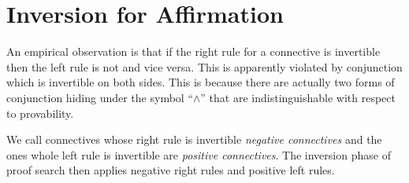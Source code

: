 \documentclass[11pt]{article}
\begin{document}
\section{Inversion for Affirmation}

An empirical observation is that if the right rule for a connective is
invertible then the left rule is not and vice versa.  This is apparently
violated by conjunction which is invertible on both sides.  This is because
there are actually two forms of conjunction hiding under the symbol ``$\land$''
that are indistinguishable with respect to provability.

We call connectives whose right rule is invertible \emph{negative connectives}
and the ones whole left rule is invertible are \emph{positive connectives}.  The
inversion phase of proof search then applies negative right rules and positive
left rules.
\end{document}
